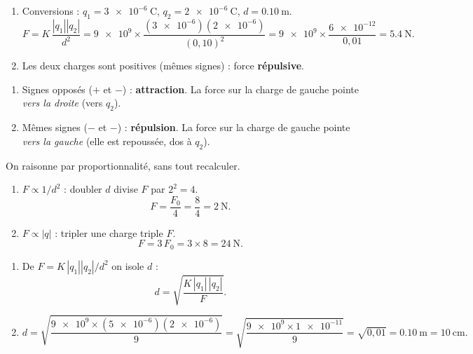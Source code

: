 \documentclass[11pt,a4paper]{article}
\begin{document}

\begin{corrige}
\begin{enumerate}[label=\alph*)]
  \item Conversions : $q_1 = \num{3e-6}\ \si{\coulomb}$, $q_2 = \num{2e-6}\ \si{\coulomb}$,
        $d = \SI{0.10}{\metre}$.
        \[ F = K\,\frac{|q_1||q_2|}{d^2}
             = \num{9e9}\times\frac{(\num{3e-6})(\num{2e-6})}{(0{,}10)^2}
             = \num{9e9}\times\frac{\num{6e-12}}{0{,}01} = \SI{5.4}{\newton}. \]
  \item Les deux charges sont positives (mêmes signes) : force \textbf{répulsive}.
\end{enumerate}
\end{corrige}

\begin{corrige}
\begin{enumerate}[label=\alph*)]
  \item Signes opposés ($+$ et $-$) : \textbf{attraction}. La force sur la charge de gauche pointe
        \emph{vers la droite} (vers $q_2$).
  \item Mêmes signes ($-$ et $-$) : \textbf{répulsion}. La force sur la charge de gauche pointe
        \emph{vers la gauche} (elle est repoussée, dos à $q_2$).
\end{enumerate}
\end{corrige}

\begin{corrige}
On raisonne par proportionnalité, sans tout recalculer.
\begin{enumerate}[label=\alph*)]
  \item $F \propto 1/d^2$ : doubler $d$ divise $F$ par $2^2 = 4$.
        \[ F = \frac{F_0}{4} = \frac{8}{4} = \SI{2}{\newton}. \]
  \item $F \propto |q|$ : tripler une charge triple $F$.
        \[ F = 3\,F_0 = 3\times 8 = \SI{24}{\newton}. \]
\end{enumerate}
\end{corrige}

\begin{corrige}
\begin{enumerate}[label=\alph*)]
  \item De $F = K\,|q_1||q_2|/d^2$ on isole $d$ :
        \[ d = \sqrt{\frac{K\,|q_1|\,|q_2|}{F}}. \]
  \item \[ d = \sqrt{\frac{\num{9e9}\times(\num{5e-6})(\num{2e-6})}{9}}
             = \sqrt{\frac{\num{9e9}\times\num{1e-11}}{9}} = \sqrt{0{,}01}
             = \SI{0.10}{\metre} = \SI{10}{\centi\metre}. \]
\end{enumerate}
\end{corrige}
\end{document}

